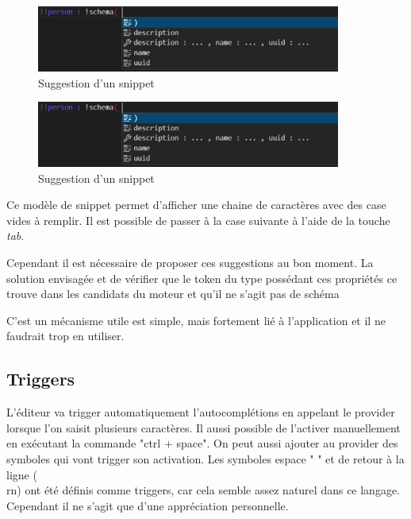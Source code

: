 \documentclass[
    iict, %
    il, %
]{heig-tb}
\begin{document}
\begin{figure}[!h]
    \begin{center}
        \includegraphics[width=10cm]{assets/figures/snippet-suggestion.png}
    \end{center}
    \caption[Suggestion d'un snippet]{\label{snippet-suggestion} Suggestion d'un snippet}
\end{figure}

\begin{figure}[!h]
    \begin{center}
        \includegraphics[width=10cm]{assets/figures/snippet-suggestion.png}
    \end{center}
    \caption[Suggestion d'un snippet]{\label{snippet-suggestion} Suggestion d'un snippet}
\end{figure}

Ce modèle de snippet permet d'afficher une chaine de caractères avec des case vides à remplir.
Il est possible de passer à la case suivante à l'aide de la touche \emph{tab}.

Cependant il est nécessaire de proposer ces suggestions au bon moment. La solution envisagée et de vérifier que le token du type possédant
ces propriétés ce trouve dans les candidats du moteur et qu'il ne s'agit pas de schéma

C'est un mécanisme utile est simple, mais fortement lié à l'application et il ne faudrait trop en utiliser.

\subsection{Triggers}
L'éditeur va trigger automatiquement l'autocomplétions en appelant le provider lorsque l'on saisit plusieurs caractères. Il aussi possible de l'activer manuellement en exécutant la commande "ctrl + space".
On peut aussi ajouter au provider des symboles qui vont trigger son activation. Les symboles espace " " et de retour à la ligne (\\rn) ont été définis comme triggers, car cela semble assez naturel dans ce langage.
Cependant il ne s'agit que d'une appréciation personnelle.
\end{document}
